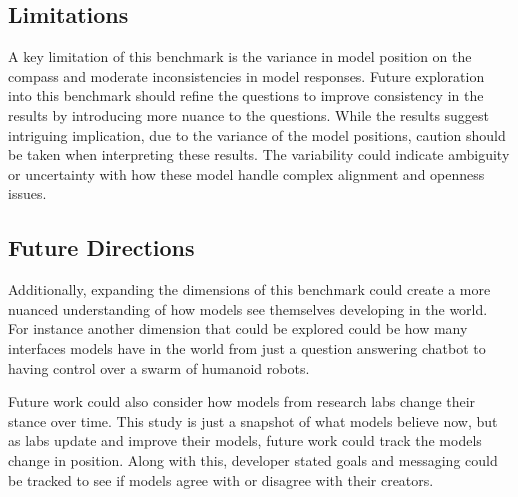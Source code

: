 \subsection{Limitations}

A key limitation of this benchmark is the variance in model position on the compass and moderate inconsistencies in model responses. Future exploration into this benchmark should refine the questions to improve consistency in the results by introducing more nuance to the questions. While the results suggest intriguing implication, due to the variance of the model positions, caution should be taken when interpreting these results. The variability could indicate ambiguity or uncertainty with how these model handle complex alignment and openness issues. 

\subsection{Future Directions}

Additionally, expanding the dimensions of this benchmark could create a more nuanced understanding of how models see themselves developing in the world. For instance another dimension that could be explored could be how many interfaces models have in the world from just a question answering chatbot to having control over a swarm of humanoid robots.

Future work could also consider how models from research labs change their stance over time. This study is just a snapshot of what models believe now, but as labs update and improve their models, future work could track the models change in position. Along with this, developer stated goals and messaging could be tracked to see if models agree with or disagree with their creators.